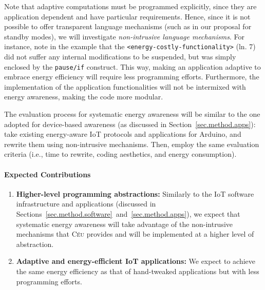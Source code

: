 \documentclass[12pt,english]{amsart}
\newcommand{\CEU}{\textsc{C\'{e}u}\xspace}
\newcommand{\code}[1] {{\small{\texttt{#1}}}}
\begin{document}
Note that adaptive computations must be programmed explicitly, since they
are application dependent and have particular requirements.
%
Hence, since it is not possible to offer transparent language mechanisms (such
as in our proposal for standby modes), we will investigate \emph{non-intrusive
language mechanisms}.
For instance, note in the example that the \code{<energy-costly-functionality>}
(ln. 7) did not suffer any internal modifications to be suspended, but was
simply enclosed by the \code{pause/if} construct.
%
This way, making an application adaptive to embrace energy efficiency will
require less programming efforts.
Furthermore, the implementation of the application functionalities will not be
intermixed with energy awareness, making the code more modular.

The evaluation process for systematic energy awareness will be similar to the
one adopted for device-based awareness (as discussed in
Section~\ref{sec.method.apps}):
take existing energy-aware IoT protocols and applications for Arduino, and
rewrite them using non-intrusive mechanisms.
Then, employ the same evaluation criteria
(i.e., time to rewrite, coding aesthetics, and energy consumption).
%

\paragraph{\textbf{Expected Contributions}}
\begin{enumerate}
\item \textbf{Higher-level programming abstractions:}
    Similarly to the IoT software infrastructure and applications (discussed in
    Sections~\ref{sec.method.software}~and~\ref{sec.method.apps}), we expect
    that systematic energy awareness will take advantage of the non-intrusive mechanisms
    that \CEU provides and will be implemented at a higher level of abstraction.
\item \textbf{Adaptive and energy-efficient IoT applications:}
    We expect to achieve the same energy efficiency as that of hand-tweaked
    applications but with less programming efforts.
\end{enumerate}
\end{document}
